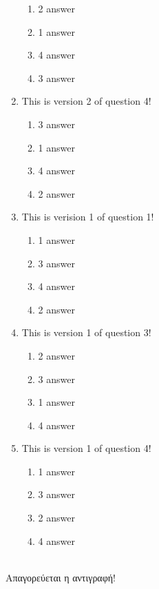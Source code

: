 \documentclass[a4paper, 11pt]{article}
\begin{document}
\begin{enumerate}
\begin{enumerate}[(1)]
    \item 2 answer
    \item 1 answer
    \item 4 answer
    \item 3 answer
\end{enumerate}
\item This is version 2 of question 4!
\begin{enumerate}[(1)]
    \item 3 answer
    \item 1 answer
    \item 4 answer
    \item 2 answer
\end{enumerate}
\item This is verision 1 of question 1!
\begin{enumerate}[(1)]
    \item 1 answer
    \item 3 answer
    \item 4 answer
    \item 2 answer
\end{enumerate}
\item This is version 1 of question 3!
\begin{enumerate}[(1)]
    \item 2 answer
    \item 3 answer
    \item 1 answer
    \item 4 answer
\end{enumerate}
\item This is version 1 of question 4!
\begin{enumerate}[(1)]
    \item 1 answer
    \item 3 answer
    \item 2 answer
    \item 4 answer
\end{enumerate}
\end{enumerate}
\hrulefill \\ 

Απαγορεύεται η αντιγραφή! 

\newpage 
\end{document}
